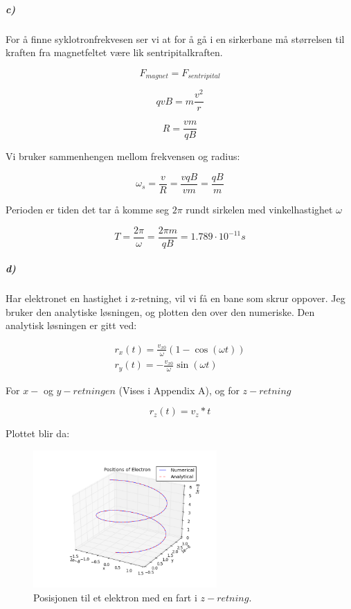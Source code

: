 \documentclass[a4paper,norsk, 10pt]{article}
\begin{document}
\newpage

\subparagraph*{c)}
For å finne syklotronfrekvesen ser vi at for å gå i en sirkerbane må størrelsen til kraften fra magnetfeltet være lik sentripitalkraften.

$$
F_{magnet} = F_{sentripital}
$$

\begin{equation}
qvB = m\frac{v^2}{r}
\end{equation}


\begin{equation}
R = \frac{vm}{qB}
\end{equation}

Vi bruker sammenhengen mellom frekvensen og radius:

\begin{equation}
\omega_s = \frac{v}{R} = \frac{vqB}{vm} = \frac{qB}{m}
\end{equation}


Perioden er tiden det tar å komme seg $2\pi$ rundt sirkelen med vinkelhastighet $\omega$

\begin{equation}
T = \frac{2\pi}{\omega} = \frac{2\pi m}{qB} = 1.789\cdot 10^{-11} s
\end{equation} 

\subparagraph*{d)}

Har elektronet en hastighet i z-retning, vil vi få en bane som skrur oppover.
Jeg bruker den analytiske løsningen, og plotten den over den numeriske. Den analytisk løsningen er gitt ved:

\begin{equation}
\begin{split}
r_x(t) = \frac{v_{x0}}{\omega}(1-\cos(\omega t))
\\
r_y(t) = -\frac{v_{x0}}{\omega}\sin(\omega t)
\end{split}
\end{equation}

For $x-$ og $y-retningen$ (Vises i Appendix A), og for $z-retning$

\begin{equation}
r_z(t) = v_{z}*t
\end{equation}

Plottet blir da:

\begin{figure}[H]
\begin{center}
\includegraphics[width = 70mm]{opp2dPos3dwAnalytic.png}
\caption{Posisjonen til et elektron med en fart i $z-retning$.}
\end{center}
\end{figure}
\end{document}
